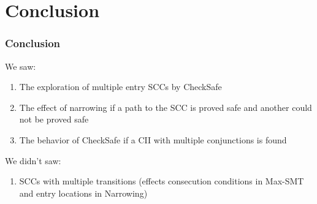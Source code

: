 \documentclass{beamer}
\begin{document}
\begin{frame}




\end{frame}

\section{Conclusion}

\begin{frame}
  \frametitle{Conclusion}
  \begin{block}{We saw:}
    \begin{enumerate}
    \item The exploration of multiple entry SCCs by CheckSafe
    \item The effect of narrowing if a path to the SCC is proved safe and another could not be proved safe
    \item The behavior of CheckSafe if a CII with multiple conjunctions is found
    \end{enumerate}
  \end{block}
  \begin{block}{We didn't saw:}
    \begin{enumerate}
    \item SCCs with multiple transitions (effects consecution conditions in Max-SMT and entry locations in Narrowing)
    \end{enumerate}
  \end{block}
\end{frame}
\end{document}
